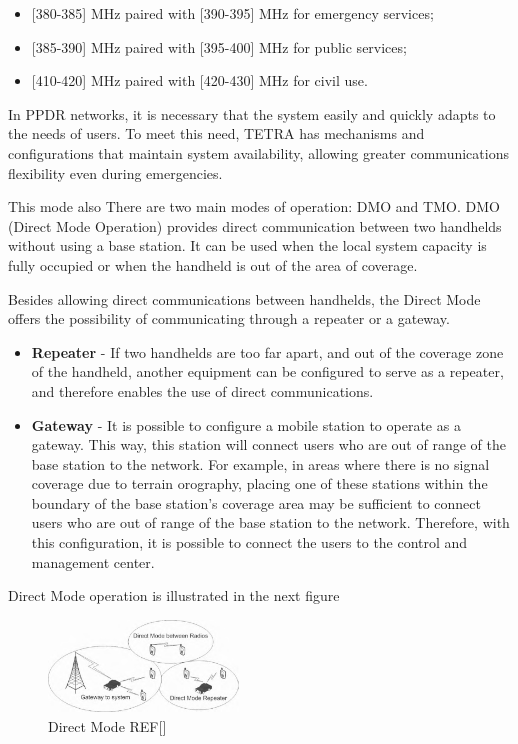 \documentclass[letterpaper, 10 pt, conference]{ieeeconf}  %
\begin{document}
\begin{itemize}
    \item  \hspace{1.2mm}   [380-385] MHz paired with [390-395] MHz for emergency services;
    \item   \hspace{1.2mm}  [385-390] MHz paired with [395-400] MHz for public services;
    \item   \hspace{1.2mm}  [410-420] MHz paired with [420-430] MHz for civil use.
\end{itemize}
\par\noindent
In PPDR  networks, it is necessary that the system easily and quickly adapts to the needs of users. To meet this need, TETRA has mechanisms and configurations that maintain system availability, allowing greater communications flexibility even during emergencies.
\par\noindent This mode also There are two main modes of operation: DMO and TMO. DMO (Direct Mode Operation) provides direct communication between two handhelds without using a base station. It can be used when the local system capacity is fully occupied or when the handheld is out of the area of coverage.\par\noindent
Besides allowing direct communications between handhelds, the Direct Mode offers the possibility of communicating through a repeater or a gateway.
\begin{itemize}
    \item \textbf{Repeater} - If two handhelds are too far apart, and out of the coverage zone of the handheld, another equipment can be configured to serve as a repeater, and therefore enables the use of direct communications.
    \item \textbf{Gateway} - It is possible to configure a mobile station to operate as a gateway. This way, this station will connect users who are out of range of the base station to the network. For example, in areas where there is no signal coverage due to terrain orography, placing one of these stations within the boundary of the base station's coverage area may be sufficient to connect users who are out of range of the base station to the network. Therefore, with this configuration, it is possible to connect the users to the control and management center.
\end{itemize}
\par\noindent Direct Mode operation is illustrated in the next figure
\begin{figure}[h]
    \centering
    \includegraphics[width=0.45\textwidth]{DMO_PAPER.jpg}
    \caption{Direct Mode REF[]}
    \label{fig:DMO}
\end{figure}
\FloatBarrier
\end{document}
